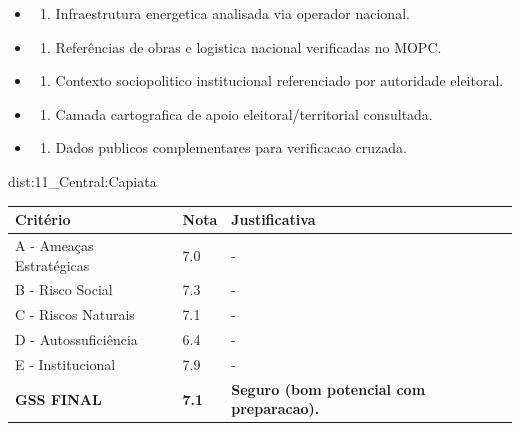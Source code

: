 {\begin{itemize}
\item
  \begin{enumerate}
  \def\labelenumi{\arabic{enumi})}
  \setcounter{enumi}{7}
  \tightlist
  \item
    Infraestrutura energetica analisada via operador nacional.
  \end{enumerate}
\item
  \begin{enumerate}
  \def\labelenumi{\arabic{enumi})}
  \setcounter{enumi}{8}
  \tightlist
  \item
    Referências de obras e logistica nacional verificadas no MOPC.
  \end{enumerate}
\item
  \begin{enumerate}
  \def\labelenumi{\arabic{enumi})}
  \setcounter{enumi}{9}
  \tightlist
  \item
    Contexto sociopolitico institucional referenciado por autoridade
    eleitoral.
  \end{enumerate}
\item
  \begin{enumerate}
  \def\labelenumi{\arabic{enumi})}
  \setcounter{enumi}{10}
  \tightlist
  \item
    Camada cartografica de apoio eleitoral/\allowbreak territorial consultada.
  \end{enumerate}
\item
  \begin{enumerate}
  \def\labelenumi{\arabic{enumi})}
  \setcounter{enumi}{11}
  \tightlist
  \item
    Dados publicos complementares para verificacao cruzada.
  \end{enumerate}
\end{itemize}}{dist:11_Central:Capiata}
\begin{table}[ht!]
\small \begin{tabular}{p{3.0cm}p{0.8cm}p{6.0cm}} \toprule
\textbf{Critério} & \textbf{Nota} & \textbf{Justificativa} \\ \midrule
A - Ameaças Estratégicas & 7.0 & - \\
B - Risco Social & 7.3 & - \\
C - Riscos Naturais & 7.1 & - \\
D - Autossuficiência & 6.4 & - \\
E - Institucional & 7.9 & - \\
\midrule \textbf{GSS FINAL} & \textbf{7.1} & \textbf{Seguro (bom potencial com preparacao).} \\ \bottomrule \end{tabular}
\end{table}
